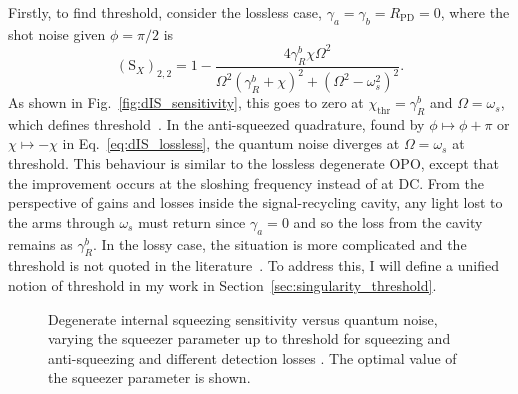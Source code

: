 Firstly, to find threshold, consider the lossless case, $\gamma_a=\gamma_b=R_\text{PD}=0$, where the shot noise given $\phi=\pi/2$ is 
\begin{equation}
\label{eq:dIS_lossless}
(\text{S}_X)_{2,2}=1-\frac{4 \gamma^b_R \chi \Omega ^2}{\Omega ^2 (\gamma^b_R+\chi )^2+(\Omega ^2-\omega_s^2)^2}.
\end{equation}
As shown in Fig.~\ref{fig:dIS_sensitivity}, this goes to zero at $\chi_\text{thr}=\gamma^b_R$ and $\Omega=\omega_s$, which defines threshold~\cite{}. In the anti-squeezed quadrature, found by $\phi\mapsto\phi+\pi$ or $\chi\mapsto-\chi$ in Eq.~\ref{eq:dIS_lossless}, the quantum noise diverges at $\Omega=\omega_s$ at threshold. This behaviour is similar to the lossless degenerate OPO, except that the improvement occurs at the sloshing frequency instead of at DC. From the perspective of gains and losses inside the signal-recycling cavity, any light lost to the arms through $\omega_s$ must return since $\gamma_a=0$ and so the loss from the cavity remains as $\gamma^b_R$. In the lossy case, the situation is more complicated and the threshold is not quoted in the literature~\cite{}. To address this, I will define a unified notion of threshold in my work in Section~\ref{sec:singularity_threshold}. 

\begin{figure}
	\centering
	\caption{ Degenerate internal squeezing sensitivity versus quantum noise, varying the squeezer parameter up to threshold for squeezing and anti-squeezing and different detection losses . The optimal value of the squeezer parameter is shown.}
	\label{fig:dIS_optimal_squeezing}
\end{figure}

